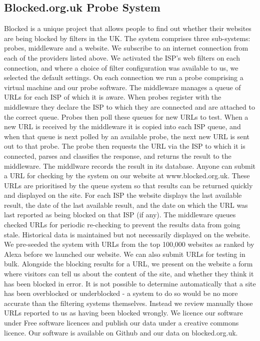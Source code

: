 \documentclass{bmcart}
\begin{document}
\subsection*{Blocked.org.uk Probe System}
Blocked is a unique project that allows people to find out whether their websites are being blocked by filters in the UK. The system comprises three sub-systems: probes, middleware and a website.
We subscribe to an internet connection from each of the providers listed above. We activated the ISP's web filters on each connection, and where a choice of filter configuration was available to us, we selected the default settings.
On each connection we run a probe comprising a virtual machine and our probe software. The middleware manages a queue of URLs for each ISP of which it is aware. When probes register with the middleware they declare the ISP to which they are connected and are attached to the correct queue. Probes then poll these queues for new URLs to test.
When a new URL is received by the middleware it is copied into each ISP queue, and when that queue is next polled by an available probe, the next new URL is sent out to that probe. The probe then requests the URL via the ISP to which it is connected, parses and classifies the response, and returns the result to the middleware. The middlware records the result in its database.
Anyone can submit a URL for checking by the system on our website at www.blocked.org.uk. These URLs are prioritised by the queue system so that results can be returned quickly and displayed on the site. For each ISP the website displays the last available result, the date of the last available result, and the date on which the URL was last reported as being blocked on that ISP (if any).
The middleware queues checked URLs for periodic re-checking to prevent the results data from going stale. Historical data is maintained but not necessarily displayed on the website.
We pre-seeded the system with URLs from the top 100,000 websites as ranked by Alexa before we launched our website. We can also submit URLs for testing in bulk.
Alongside the blocking results for a URL, we present on the website a form where visitors can tell us about the content of the site, and whether they think it has been blocked in error. It is not possible to determine automatically that a site has been overblocked or underblocked - a system to do so would be no more accurate than the filtering systems themselves. Instead we review manually those URLs reported to us as having been blocked wrongly.
We licence our software under Free software licences and publish our data under a creative commons licence. Our software is available on Github and our data on blocked.org.uk.
\end{document}

